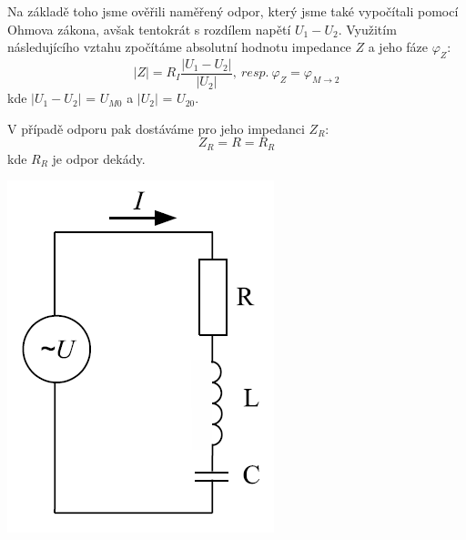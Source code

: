 \documentclass[a4paper,11pt]{article}
\begin{document}
\begin{minipage}[t]{0.5\textwidth} 
             Na základě toho jsme ověřili naměřený odpor, který jsme také vypočítali pomocí Ohmova zákona, avšak tentokrát s rozdílem napětí $U_1 - U_2$. Využitím následujícího vztahu zpočítáme absolutní hodnotu impedance $Z$ a jeho fáze $\varphi_Z$:
            \begin{equation}
                \vert Z\vert = R_I \frac{\vert U_1-U_2\vert}{\vert U_2\vert}, ~resp.~ \varphi_Z = \varphi_{M\rightarrow 2}
            \end{equation}
            kde $\vert U_1-U_2\vert$ = $U_{M0}$ a $\vert U_2\vert$ = $U_{20}$.
            \par V případě odporu pak dostáváme pro jeho impedanci $Z_R$:
            \begin{equation}
                Z_R = R = R_R
            \end{equation}
            kde $R_R$ je odpor dekády.
            \vspace{10pt}
            \par \centering
            \includegraphics[scale=0.4]{rlc}
            \captionsetup{justification=centering, font=footnotesize}
            \label{fig:rlc}
            \vspace{10pt}
            \raggedright
            \vspace{10pt}
            \par 
\end{minipage}
\newpage
\end{document}
